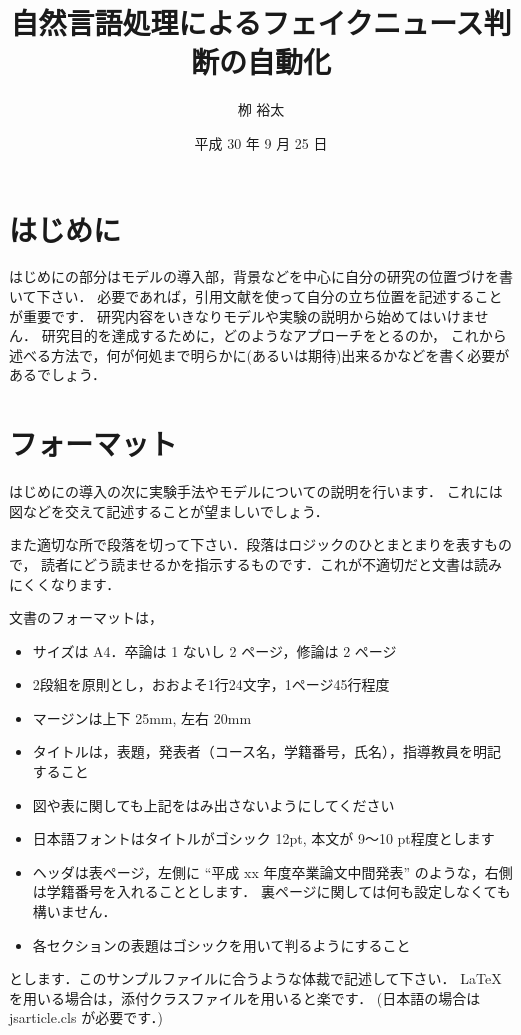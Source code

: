 \documentclass[twocolumn, a4paper, uplatex]{UECIEresume}
\title{自然言語処理によるフェイクニュース判断の自動化}
\date{平成 30 年 9 月 25 日}
\affiliation{総合情報学科 メディア情報学 コース}
\author{栁 裕太}
\begin{document}
\maketitle

\section{はじめに}
はじめにの部分はモデルの導入部，背景などを中心に自分の研究の位置づけを書いて下さい．
必要であれば，引用文献を使って自分の立ち位置を記述することが重要です．
研究内容をいきなりモデルや実験の説明から始めてはいけません．
研究目的を達成するために，どのようなアプローチをとるのか，
これから述べる方法で，何が何処まで明らかに(あるいは期待)出来るかなどを書く必要があるでしょう．

\section{フォーマット}
はじめにの導入の次に実験手法やモデルについての説明を行います．
これには図などを交えて記述することが望ましいでしょう．

また適切な所で段落を切って下さい．段落はロジックのひとまとまりを表すもので，
読者にどう読ませるかを指示するものです．これが不適切だと文書は読みにくくなります．

文書のフォーマットは，
\begin{itemize}
  \item{サイズは A4．卒論は 1 ないし 2 ページ，修論は 2 ページ}
  \item{2段組を原則とし，おおよそ1行24文字，1ページ45行程度}
  \item{マージンは上下 25mm, 左右 20mm}
  \item{タイトルは，表題，発表者（コース名，学籍番号，氏名），指導教員を明記すること}
  \item{図や表に関しても上記をはみ出さないようにしてください}
  \item{日本語フォントはタイトルがゴシック 12pt, 本文が 9〜10 pt程度とします}
  \item{ヘッダは表ページ，左側に ``平成 xx 年度卒業論文中間発表'' のような，右側は学籍番号を入れることとします．
      裏ページに関しては何も設定しなくても構いません．
    }
  \item{各セクションの表題はゴシックを用いて判るようにすること}
\end{itemize}
とします．このサンプルファイルに合うような体裁で記述して下さい．
\LaTeX を用いる場合は，添付クラスファイルを用いると楽です．
(日本語の場合は jsarticle.cls が必要です．)
\end{document}
